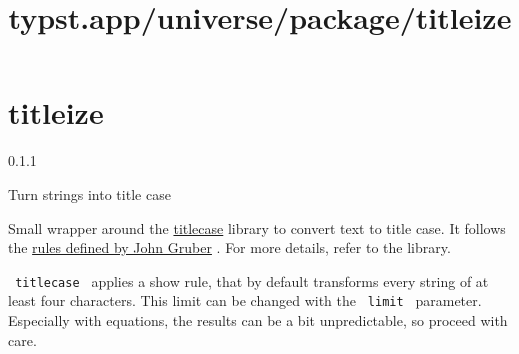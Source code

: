 \title{typst.app/universe/package/titleize}

\label{banner}
\section{titleize}\label{titleize}

{ 0.1.1 }

Turn strings into title case

\label{readme}
Small wrapper around the
\href{https://crates.io/crates/titlecase}{titlecase} library to convert
text to title case. It follows the
\href{https://daringfireball.net/2008/05/title_case}{rules defined by
John Gruber} . For more details, refer to the library.

\texttt{\ titlecase\ } applies a show rule, that by default transforms
every string of at least four characters. This limit can be changed with
the \texttt{\ limit\ } parameter. Especially with equations, the results
can be a bit unpredictable, so proceed with care.

\begin{Shaded}
\begin{Highlighting}[]

\NormalTok{) [}
\NormalTok{]}

\NormalTok{    [}
\NormalTok{      \#for (k, v) in fields [}
\NormalTok{      ]}
\NormalTok{    ]}
\NormalTok{    if type(x) == array [}
\NormalTok{      \#for y in x [}
\NormalTok{      ]}
\NormalTok{    ] else [}
\NormalTok{    ]}
\NormalTok{  \}}
\NormalTok{\}}




\NormalTok{$}
\NormalTok{$}
\end{Highlighting}
\end{Shaded}

